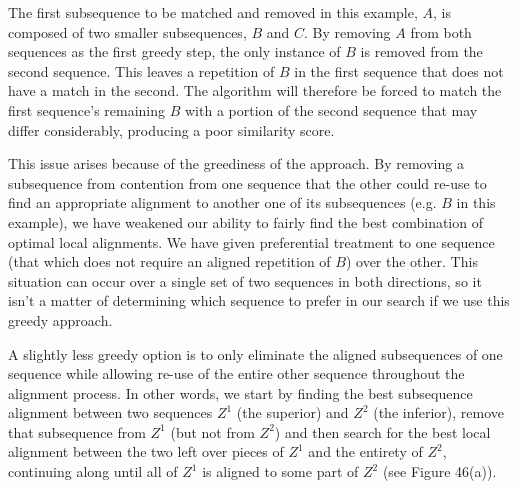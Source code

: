 \documentclass[12pt]{report} 	%
\numberwithin{figure}{chapter}
\numberwithin{table}{chapter}
\numberwithin{equation}{chapter}
\begin{document}
\begin{flushleft}
The first subsequence to be matched and removed in this example, $A$, is composed of two smaller subsequences, $B$ and $C$. By removing $A$ from both sequences as the first greedy step, the only instance of $B$ is removed from the second sequence. This leaves a repetition of $B$ in the first sequence that does not have a match in the second. The algorithm will therefore be forced to match the first sequence's remaining $B$ with a portion of the second sequence that may differ considerably, producing a poor similarity score.

This issue arises because of the greediness of the approach. By removing a subsequence from contention from one sequence that the other could re-use to find an appropriate alignment to another one of its subsequences (e.g. $B$ in this example), we have weakened our ability to fairly find the best combination of optimal local alignments. We have given preferential treatment to one sequence (that which does not require an aligned repetition of $B$) over the other. This situation can occur over a single set of two sequences in both directions, so it isn't a matter of determining which sequence to prefer in our search if we use this greedy approach. 

A slightly less greedy option is to only eliminate the aligned subsequences of one sequence while allowing re-use of the entire other sequence throughout the alignment process. In other words, we start by finding the best subsequence alignment between two sequences $Z^1$ (the superior) and $Z^2$ (the inferior), remove that subsequence from $Z^1$ (but not from $Z^2$) and then search for the best local alignment between the two left over pieces of $Z^1$ and the entirety of $Z^2$, continuing along until all of $Z^1$ is aligned to some part of $Z^2$ (see Figure 46(a)).


\end{flushleft}
\end{document}
